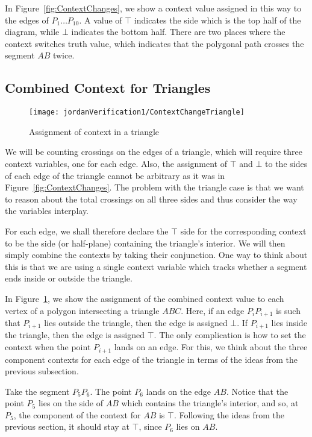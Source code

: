 In Figure~\ref{fig:ContextChanges}, we show a context value assigned in this way to the edges of $P_1\ldots P_{10}$. A value of $\top$ indicates the side which is the top half of the diagram, while $\bot$ indicates the bottom half. There are two places where the context switches truth value, which indicates that the polygonal path crosses the segment $AB$ twice.

\subsection{Combined Context for Triangles}
\begin{figure}
\centering\texttt{[image: jordanVerification1/ContextChangeTriangle]}
\caption{Assignment of context in a triangle}
\label{fig:ContextChangesTriangle}
\end{figure}

We will be counting crossings on the edges of a triangle, which will require three context variables, one for each edge. Also, the assignment of $\top$ and $\bot$ to the sides of each edge of the triangle cannot be arbitrary as it was in Figure~\ref{fig:ContextChanges}. The problem with the triangle case is that we want to reason about the total crossings on all three sides and thus consider the way the variables interplay.

For each edge, we shall therefore declare the $\top$ side for the corresponding context to be the side (or half-plane) containing the triangle's interior. We will then simply combine the contexts by taking their conjunction. One way to think about this is that we are using a single context variable which tracks whether a segment ends inside or outside the triangle.

In Figure~\ref{fig:ContextChangesTriangle}, we show the assignment of the combined context value to each vertex of a polygon intersecting a triangle $ABC$. Here, if an edge $P_iP_{i+1}$ is such that $P_{i+1}$ lies outside the triangle, then the edge is assigned $\bot$. If $P_{i+1}$ lies inside the triangle, then the edge is assigned $\top$. The only complication is how to set the context when the point $P_{i+1}$ lands on an edge. For this, we think about the three component contexts for each edge of the triangle in terms of the ideas from the previous subsection.

Take the segment $P_5P_6$. The point $P_6$ lands on the edge $AB$. Notice that the point $P_5$ lies on the side of $AB$ which contains the triangle's interior, and so, at $P_5$, the component of the context for $AB$ is $\top$. Following the ideas from the previous section, it should stay at $\top$, since $P_6$ lies on $AB$.

